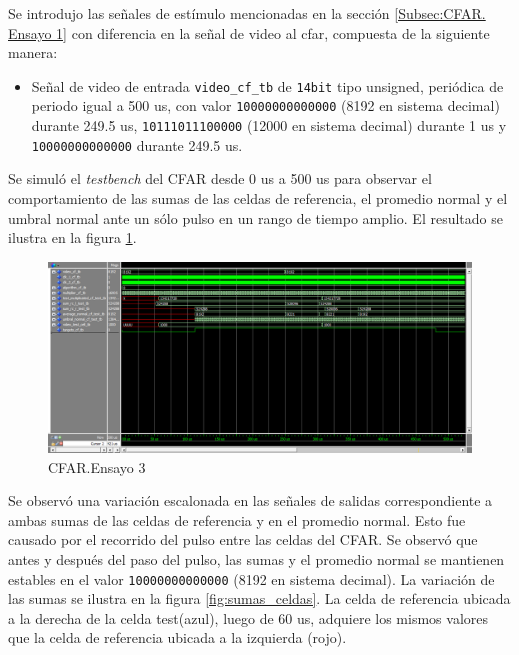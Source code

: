 Se introdujo las señales de estímulo mencionadas en la sección \ref{Subsec:CFAR. Ensayo 1} con diferencia en la señal de video al cfar, compuesta de la siguiente manera:

\begin{itemize}
\item Señal de video de entrada \texttt{video\_cf\_tb} de \texttt{14\-bit} tipo unsigned, periódica de periodo igual a 500 us, con valor \texttt{10000000000000} (8192 en sistema decimal) durante 249.5 us, \texttt{10111011100000} (12000 en sistema decimal) durante 1 us y \texttt{10000000000000} durante 249.5 us.
\end{itemize}

Se simuló el \textit{testbench} del CFAR desde 0 us a 500 us para observar el comportamiento de las sumas de las celdas de referencia, el promedio normal y el umbral normal ante un sólo pulso en un rango de tiempo amplio. El resultado se ilustra en la figura \ref{fig:cfar_ensayo_3}.

\begin{figure}
\centering
\includegraphics[scale=0.52, angle=270]{./Figures/cfar_ensayo_3.png}
\caption{CFAR.Ensayo 3}
\label{fig:cfar_ensayo_3}
\end{figure}

Se observó una variación escalonada en las señales de salidas correspondiente a ambas sumas de las celdas de referencia y en el promedio normal. Esto fue causado por el recorrido del pulso entre las celdas del CFAR. Se observó que antes y después del paso del pulso, las sumas y el promedio normal se mantienen estables en el valor \texttt{10000000000000} (8192 en sistema decimal). La variación de las sumas se ilustra en la figura \ref{fig:sumas_celdas}. La celda de referencia ubicada a la derecha de la celda test(azul), luego de 60 us, adquiere los mismos valores que la celda de referencia ubicada a la izquierda (rojo).

